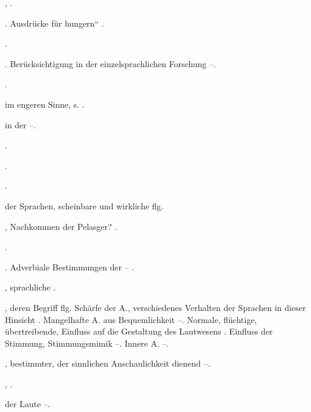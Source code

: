 \begin{register}
 \pageref{sp.149}, \pageref{sp.257}.

. Ausdrücke für hungern“ \pageref{sp.482}.

 \pageref{sp.248}.


 \pageref{sp.107}. Berücksichtigung in der einzelsprachlichen Forschung \pageref{sp.125}–\pageref{sp.127}.

 \pageref{sp.45}.

 im engeren Sinne, s. .

 in der  \pageref{sp.249}–\pageref{sp.250}.

 \pageref{sp.20}.

 \pageref{sp.267}.

 \pageref{sp.256}.

 der Sprachen, scheinbare und wirkliche \pageref{sp.406} flg.

, Nachkommen der Pelasger? \pageref{sp.146}.

 \pageref{sp.256}. 


. Adverbiale Bestimmungen der – \pageref{sp.101}.

, sprachliche \pageref{sp.15}.


, deren Begriff \pageref{sp.4} flg. Schärfe der A., verschiedenes Verhalten der Sprachen in dieser Hinsicht \pageref{sp.34}. Mangelhafte A. aus Bequemlichkeit \pageref{sp.181}–\pageref{sp.182}. Normale, flüchtige, übertreibende, Einfluss auf die Gestaltung des Lautwesens \pageref{sp.183}.  Einfluss der Stimmung, Stimmungsmimik \pageref{sp.376}–\pageref{sp.380}. Innere A. \pageref{sp.432}–\pageref{sp.437}.

, bestimmter, der sinnlichen Anschaulichkeit dienend \pageref{sp.415}–\pageref{sp.416}.

 \pageref{sp.150}, \pageref{sp.282}.

 der Laute \pageref{sp.37}–\pageref{sp.38}.


\end{register}
